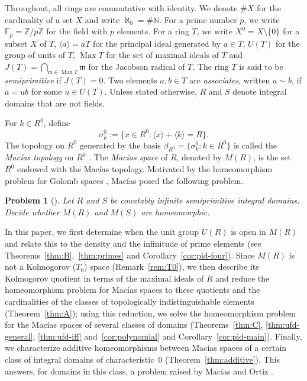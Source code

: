 \documentclass[12pt,reqno,a4paper]{amsart}
\newcommand{\Z}{\mathbb{Z}}
\newcommand{\N}{\mathbb{N}}
\newcommand{\F}{\mathbb{F}}
\newcommand{\m}{\mathfrak{m}}
\DeclareMathOperator{\Max}{Max}
\theoremstyle{plain}
\newtheorem*{macproblem}{Problem}
\theoremstyle{definition}
\begin{document}
Throughout, all rings are commutative with identity. We denote $\#X$ for the cardinality of a set $X$ and write $\aleph_0=\#\N$. For a prime number $p$, we write $\F_p=\Z/p\Z$ for the field with $p$ elements. For a ring $T$, we write $X^0=X\setminus\{0\}$ for a subset $X$ of $T$, $\langle a\rangle=aT$ for the principal ideal generated by $a\in T$, $U(T)$ for the group of units of $T$, $\Max T$ for the set of maximal ideals of $T$ and $J(T)=\bigcap\limits_{\m\in\Max T}\m$ for the Jacobson radical of $T$. The ring $T$ is said to be \emph{semiprimitive} if $J(T)=0$. Two elements $a,b\in T$ are \emph{associates}, written $a\sim b$, if $a=ub$ for some $u\in U(T)$. Unless stated otherwise, $R$ and $S$ denote integral domains that are not fields.

For $k\in R^0$, define
\[
\sigma_k^0:=\{x\in R^0:\langle x\rangle+\langle k\rangle=R\}.
\]
The topology on $R^0$ generated by the basis $\beta_{R^0}=\{\sigma_k^0:k\in R^0\}$ is called the \emph{Mac\'ias topology} on $R^0$ \cite{MaciasDomains}. The \emph{Mac\'ias space} of $R$, denoted by $M(R)$, is the set $R^0$ endowed with the Mac\'ias topology. Motivated by the homeomorphism problem for Golomb spaces \cite[Section~3]{CLLP}, Mac\'ias posed the following problem.

\begin{macproblem}[{\cite[Problem~4.1]{MaciasDomains}}]
Let $R$ and $S$ be countably infinite semiprimitive integral domains. Decide whether $M(R)$ and $M(S)$ are homeomorphic.
\end{macproblem}
In this paper, we first determine when the unit group $U(R)$ is open in $M(R)$ and relate this to the density and the infinitude of prime elements (see Theorems~\ref{thm:B},~\ref{thm:primes} and Corollary~\ref{cor:pid-four}). Since $M(R)$ is not a Kolmogorov ($T_0$) space (Remark~\ref{rem:T0}), we then describe its Kolmogorov quotient in terms of the maximal ideals of $R$ and reduce the homeomorphism problem for Mac\'ias spaces to these quotients and the cardinalities of the classes of topologically indistinguishable elements (Theorem~\ref{thm:A}); using this reduction, we solve the homeomorphism problem for the Mac\'ias spaces of several classes of domains (Theorems~\ref{thm:C}, \ref{thm:ufd-general}, \ref{thm:ufd-iff} and~\ref{cor:polynomial} and Corollary~\ref{cor:pid-main}). Finally, we characterize additive homeomorphisms between Mac\'ias spaces of a certain class of integral domains of characteristic~$0$ (Theorem~\ref{thm:additive}). This answers, for domains in this class, a problem raised by Mac\'ias and Ortiz \cite[Problem~5.6]{MaciasOrtiz}.
\end{document}

